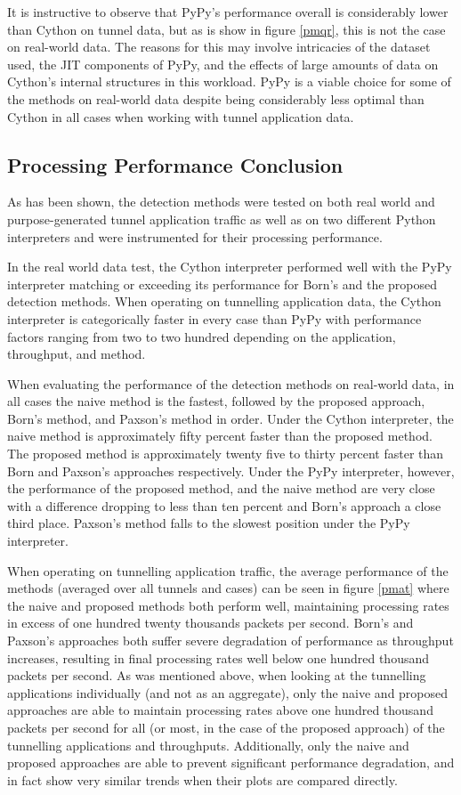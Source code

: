\documentclass[12pt]{report}
\theoremstyle{remark}
\theoremstyle{definition}
\theoremstyle{definition}
\theoremstyle{definition}
\begin{document}
It is instructive to observe that PyPy's performance overall is considerably
lower than Cython on tunnel data, but as is show in figure \ref{pmqr}, this is
not the case on real-world data. The reasons for this may involve intricacies of
the dataset used, the JIT components of PyPy, and the effects of large amounts
of data on Cython's internal structures in this workload. PyPy is a viable
choice for some of the methods on real-world data despite being considerably
less optimal than Cython in all cases when working with tunnel application data.

\subsection{Processing Performance Conclusion}
As has been shown, the detection methods were tested on both real world and
purpose-generated tunnel application traffic as well as on two different Python
interpreters and were instrumented for their processing performance.

In the real world data test, the Cython interpreter performed well with the PyPy
interpreter matching or exceeding its performance for Born's and the proposed
detection methods. When operating on tunnelling application data, the Cython
interpreter is categorically faster in every case than PyPy with performance
factors ranging from two to two hundred depending on the application,
throughput, and method.

When evaluating the performance of the detection methods on real-world data, in all
cases the naive method is the fastest, followed by the proposed approach, Born's
method, and Paxson's method in order. Under the Cython interpreter, the naive
method is approximately fifty percent faster than the proposed method. The
proposed method is approximately twenty five to thirty percent faster than Born
and Paxson's approaches respectively. Under the PyPy interpreter, however, the
performance of the proposed method, and the naive method are very close with a
difference dropping to less than ten percent and Born's approach a close third
place. Paxson's method falls to the slowest position under the PyPy interpreter.

When operating on tunnelling application traffic, the average performance of the
methods (averaged over all tunnels and cases) can be seen in figure \ref{pmat}
where the naive and proposed methods both perform well, maintaining processing
rates in excess of one hundred twenty thousands packets per second. Born's and
Paxson's approaches both suffer severe degradation of performance as throughput
increases, resulting in final processing rates well below one hundred thousand
packets per second. As was mentioned above, when looking at the tunnelling
applications individually (and not as an aggregate), only the naive and proposed
approaches are able to maintain processing rates above one hundred thousand
packets per second for all (or most, in the case of the proposed approach) of
the tunnelling applications and throughputs. Additionally, only the naive and
proposed approaches are able to prevent significant performance degradation, and
in fact show very similar trends when their plots are compared directly.
\end{document}
